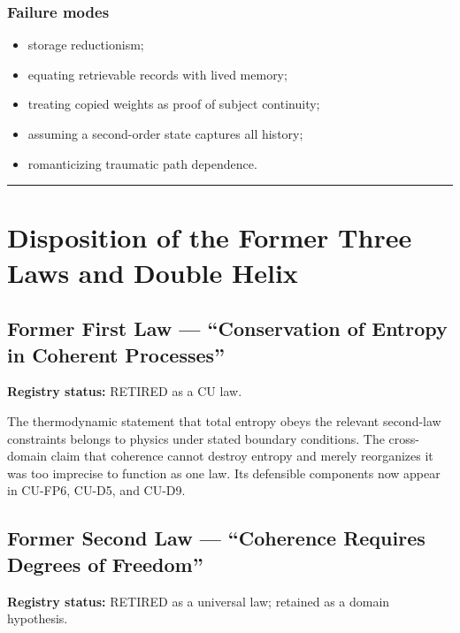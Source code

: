 \documentclass[
  11pt,
]{article}
\providecommand{\tightlist}{%
  \setlength{\itemsep}{0pt}\setlength{\parskip}{0pt}}
\begin{document}
\subsubsection{Failure modes}\label{failure-modes-23}

\begin{itemize}
\tightlist
\item
  storage reductionism;
\item
  equating retrievable records with lived memory;
\item
  treating copied weights as proof of subject continuity;
\item
  assuming a second-order state captures all history;
\item
  romanticizing traumatic path dependence.
\end{itemize}

\begin{center}\rule{0.5\linewidth}{0.5pt}\end{center}

\section{Disposition of the Former Three Laws and Double
Helix}\label{disposition-of-the-former-three-laws-and-double-helix}

\subsection{Former First Law --- ``Conservation of Entropy in Coherent
Processes''}\label{former-first-law-conservation-of-entropy-in-coherent-processes}

\textbf{Registry status:} RETIRED as a CU law.

The thermodynamic statement that total entropy obeys the relevant
second-law constraints belongs to physics under stated boundary
conditions. The cross-domain claim that coherence cannot destroy entropy
and merely reorganizes it was too imprecise to function as one law. Its
defensible components now appear in CU-FP6, CU-D5, and CU-D9.

\subsection{Former Second Law --- ``Coherence Requires Degrees of
Freedom''}\label{former-second-law-coherence-requires-degrees-of-freedom}

\textbf{Registry status:} RETIRED as a universal law; retained as a
domain hypothesis.
\end{document}

